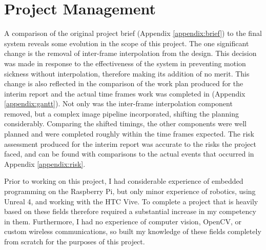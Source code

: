 \chapter{Project Management}
\label{chapter:mang}

A comparison of the original project brief (Appendix \ref{appendix:brief}) to the final system reveals some evolution in the scope of this project. The one significant change is the removal of inter-frame interpolation from the design. This decision was made in response to the effectiveness of the system in preventing motion sickness without interpolation, therefore making its addition of no merit. This change is also reflected in the comparison of the work plan produced for the interim report and the actual time frames work was completed in (Appendix \ref{appendix:gantt}). Not only was the inter-frame interpolation component removed, but a complex image pipeline incorporated, shifting the planning considerably. Comparing the shifted timings, the other components were well planned and were completed roughly within the time frames expected. The risk assessment produced for the interim report was accurate to the risks the project faced, and can be found with comparisons to the actual events that occurred in Appendix \ref{appendix:risk}.

Prior to working on this project, I had considerable experience of embedded programming on the Raspberry Pi, but only minor experience of robotics, using Unreal 4, and working with the HTC Vive. To complete a project that is heavily based on these fields therefore required a substantial increase in my competency in them. Furthermore, I had no experience of computer vision, OpenCV, or custom wireless communications, so built my knowledge of these fields completely from scratch for the purposes of this project.